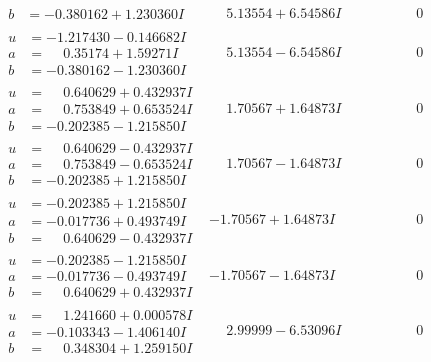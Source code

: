 \documentclass[1p]{elsarticle_modified}
\theoremstyle{definition}
\begin{document}
$$\begin{array}{c|c|c}
\begin{aligned}
b &= -0.380162 + 1.230360 I\end{aligned}
 & \phantom{-}5.13554 + 6.54586 I & \phantom{-0.000000 } 0 \\ \hline\begin{aligned}
u &= -1.217430 - 0.146682 I \\
a &= \phantom{-}0.35174 + 1.59271 I \\
b &= -0.380162 - 1.230360 I\end{aligned}
 & \phantom{-}5.13554 - 6.54586 I & \phantom{-0.000000 } 0 \\ \hline\begin{aligned}
u &= \phantom{-}0.640629 + 0.432937 I \\
a &= \phantom{-}0.753849 + 0.653524 I \\
b &= -0.202385 - 1.215850 I\end{aligned}
 & \phantom{-}1.70567 + 1.64873 I & \phantom{-0.000000 } 0 \\ \hline\begin{aligned}
u &= \phantom{-}0.640629 - 0.432937 I \\
a &= \phantom{-}0.753849 - 0.653524 I \\
b &= -0.202385 + 1.215850 I\end{aligned}
 & \phantom{-}1.70567 - 1.64873 I & \phantom{-0.000000 } 0 \\ \hline\begin{aligned}
u &= -0.202385 + 1.215850 I \\
a &= -0.017736 + 0.493749 I \\
b &= \phantom{-}0.640629 - 0.432937 I\end{aligned}
 & -1.70567 + 1.64873 I & \phantom{-0.000000 } 0 \\ \hline\begin{aligned}
u &= -0.202385 - 1.215850 I \\
a &= -0.017736 - 0.493749 I \\
b &= \phantom{-}0.640629 + 0.432937 I\end{aligned}
 & -1.70567 - 1.64873 I & \phantom{-0.000000 } 0 \\ \hline\begin{aligned}
u &= \phantom{-}1.241660 + 0.000578 I \\
a &= -0.103343 - 1.406140 I \\
b &= \phantom{-}0.348304 + 1.259150 I\end{aligned}
 & \phantom{-}2.99999 - 6.53096 I & \phantom{-0.000000 } 0 \\ \hline\begin{aligned}

\end{aligned}
\end{array}$$
\end{document}
